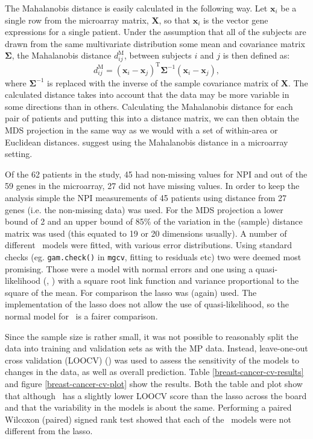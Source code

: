 The Mahalanobis distance is easily calculated in the following way. Let $\mathbf{x}_{i}$ be a single row from the microarray matrix, $\mathbf{X}$, so that $\mathbf{x}_{i}$ is the vector gene expressions for a single patient. Under the assumption that all of the subjects are drawn from the same multivariate distribution some mean and covariance matrix $\mathbf{\Sigma}$, the Mahalanobis distance $d^\text{M}_{ij}$, between subjects $i$ and $j$ is then defined as:
\begin{equation}
d^\text{M}_{ij} = (\mathbf{x}_{i} - \mathbf{x}_{j})^\text{T} \mathbf{\Sigma}^{-1} (\mathbf{x}_{i} - \mathbf{x}_{j}),
\end{equation}
where $\mathbf{\Sigma}^{-1}$ is replaced with the inverse of the sample covariance matrix of $\mathbf{X}$. The calculated distance takes into account that the data may be more variable in some directions than in others. Calculating the Mahalanobis distance for each pair of patients and putting this into a distance matrix, we can then obtain the MDS projection in the same way as we would with a set of within-area or Euclidean distances.  suggest using the Mahalanobis distance in a microarray setting.

Of the 62 patients in the study, 45 had non-missing values for NPI and out of the 59 genes in the microarray, 27 did not have missing values. In order to keep the analysis simple the NPI measurements of 45 patients using distance from 27 genes (i.e. the non-missing data) was used. For the MDS projection a lower bound of 2 and an upper bound of 85\% of the variation in the (sample) distance matrix was used (this equated to 19 or 20 dimensions usually). A number of different \mdsds\ models were fitted, with various error distributions. Using standard checks (eg. \texttt{gam.check()} in \texttt{mgcv}, fitting to residuals etc) two were deemed most promising. Those were a model with normal errors and one using a quasi-likelihood (\cite{quasi}, \cite{wood2008}) with a square root link function and variance proportional to the square of the mean. For comparison the lasso was (again) used. The implementation of the lasso does not allow the use of quasi-likelihood, so the normal model for \mdsds\ is a fairer comparison. 

Since the sample size is rather small, it was not possible to reasonably split the data into training and validation sets as with the MP data. Instead, leave-one-out cross validation (LOOCV) () was used to assess the sensitivity of the models to changes in the data, as well as overall prediction. Table \ref{breast-cancer-cv-results} and figure \ref{breast-cancer-cv-plot} show the results. Both the table and plot show that although \mdsds\ has a slightly lower LOOCV score than the lasso across the board and that the variability in the models is about the same. Performing a paired Wilcoxon (paired) signed rank test showed that each of the \mdsds\ models were not different from the lasso.

